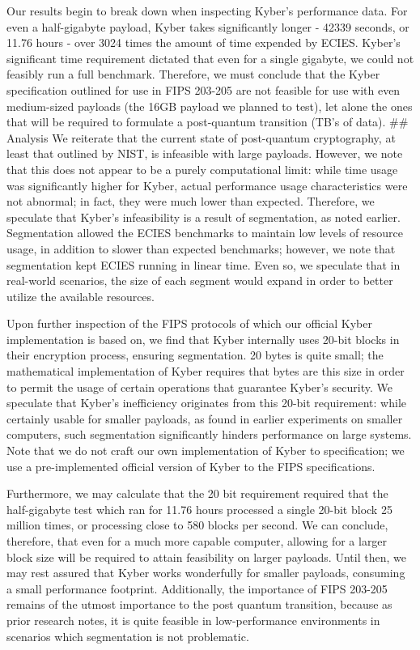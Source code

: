 \documentclass[12pt]{article}
\begin{document}
Our results begin to break down when inspecting Kyber's performance data. For even a half-gigabyte payload, Kyber takes significantly longer - 42339 seconds, or 11.76 hours - over 3024 times the amount of time expended by ECIES. Kyber's significant time requirement dictated that even for a single gigabyte, we could not feasibly run a full benchmark. Therefore, we must conclude that the Kyber specification outlined for use in FIPS 203-205 are not feasible for use with even medium-sized payloads (the 16GB payload we planned to test), let alone the ones that will be required to formulate a post-quantum transition (TB's of data). 
## Analysis
We reiterate that the current state of post-quantum cryptography, at least that outlined by NIST, is infeasible with large payloads. However, we note that this does not appear to be a purely computational limit: while time usage was significantly higher for Kyber, actual performance usage characteristics were not abnormal; in fact, they were much lower than expected. Therefore, we speculate that Kyber's infeasibility is a result of segmentation, as noted earlier. Segmentation allowed the ECIES benchmarks to maintain low levels of resource usage, in addition to slower than expected benchmarks; however, we note that segmentation kept ECIES running in linear time. Even so, we speculate that in real-world scenarios, the size of each segment would expand in order to better utilize the available resources. 

Upon further inspection of the FIPS protocols of which our official Kyber implementation is based on, we find that Kyber internally uses 20-bit blocks in their encryption process, ensuring segmentation. 20 bytes is quite small; the mathematical implementation of Kyber requires that bytes are this size in order to permit the usage of certain operations that guarantee Kyber's security. We speculate that Kyber's inefficiency originates from this 20-bit requirement: while certainly usable for smaller payloads, as found in earlier experiments on smaller computers, such segmentation significantly hinders performance on large systems. Note that we do not craft our own implementation of Kyber to specification; we use a pre-implemented official version of Kyber to the FIPS specifications. 

Furthermore, we may calculate that the 20 bit requirement required that the half-gigabyte test which ran for 11.76 hours processed a single 20-bit block 25 million times, or processing close to 580 blocks per second. We can conclude, therefore, that even for a much more capable computer, allowing for a larger block size will be required to attain feasibility on larger payloads. Until then, we may rest assured that Kyber works wonderfully for smaller payloads, consuming a small performance footprint. Additionally, the importance of FIPS 203-205 remains of the utmost importance to the post quantum transition, because as prior research notes, it is quite feasible in low-performance environments in scenarios which segmentation is not problematic. 
\end{document}
